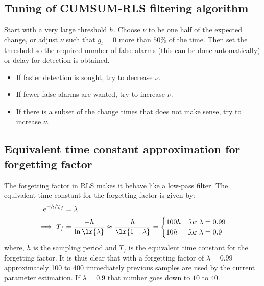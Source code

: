 \subsection{Tuning of CUMSUM-RLS filtering algorithm}
Start with a very large threshold $h$. Choose $\nu$ to be one half of the expected change, or adjust $\nu$ such that $g_t = 0$ more than $50\%$ of the time. Then set the threshold so the required number of false alarms (this can be done automatically) or delay for detection is obtained.
\begin{itemize}
        \item If faster detection is sought, try to decrease $\nu$.
        \item If fewer false alarms are wanted, try to increase $\nu$.
        \item If there is a subset of the change times that does not make sense, try to increase $\nu$.
\end{itemize}

\subsection{Equivalent time constant approximation for forgetting factor}
The forgetting factor in RLS makes it behave like a low-pass filter. The equivalent time constant for the forgetting factor is given by:
\begin{align*}
        e^{-h/T_f} &= \lambda\\
        \implies T_f &= \frac{-h}{\ln \lr{\lambda}} \approx \frac{h}{\lr{1-\lambda}} = \begin{cases}
                100 h & \text{for } \lambda = 0.99\\
                10 h & \text{for } \lambda = 0.9
        \end{cases}
\end{align*}
where, $h$ is the sampling period and $T_f$ is the equivalent time constant for the forgetting factor. It is thus clear that with a forgetting factor of $\lambda = 0.99$ approximately 100 to 400 immediately  previous samples are used by the current parameter estimation. If $\lambda = 0.9$ that number goes down to $10$ to $40$.

